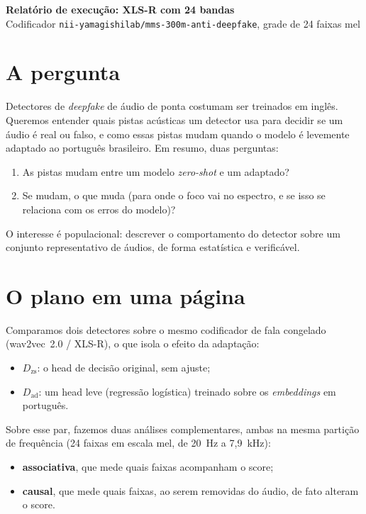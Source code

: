 \documentclass[11pt,a4paper]{article}
\begin{document}
\begin{center}
  {\large\textbf{Relatório de execução: XLS-R com 24 bandas}}\\[0.3em]
  {\small Codificador \texttt{nii-yamagishilab/mms-300m-anti-deepfake}, grade de 24 faixas mel}
\end{center}

\section{A pergunta}

Detectores de \emph{deepfake} de áudio de ponta costumam ser treinados em inglês.
Queremos entender quais pistas acústicas um detector usa para decidir se um áudio
é real ou falso, e como essas pistas mudam quando o modelo é levemente adaptado ao
português brasileiro. Em resumo, duas perguntas:

\begin{enumerate}[label=\textbf{Q\arabic*.}]
  \item As pistas mudam entre um modelo \emph{zero-shot} e um adaptado?
  \item Se mudam, o que muda (para onde o foco vai no espectro, e se isso se
        relaciona com os erros do modelo)?
\end{enumerate}

O interesse é populacional: descrever o comportamento do detector sobre um
conjunto representativo de áudios, de forma estatística e verificável.

\section{O plano em uma página}

Comparamos dois detectores sobre o mesmo codificador de fala congelado
(wav2vec~2.0 / XLS-R), o que isola o efeito da adaptação:

\begin{itemize}[nosep]
  \item $D_{\mathrm{zs}}$: o head de decisão original, sem ajuste;
  \item $D_{\mathrm{ad}}$: um head leve (regressão logística) treinado sobre os
        \emph{embeddings} em português.
\end{itemize}

Sobre esse par, fazemos duas análises complementares, ambas na mesma partição de
frequência (24 faixas em escala mel, de 20~Hz a 7{,}9~kHz):

\begin{itemize}[nosep]
  \item \textbf{associativa}, que mede quais faixas acompanham o score;
  \item \textbf{causal}, que mede quais faixas, ao serem removidas do áudio, de
        fato alteram o score.
\end{itemize}
\end{document}
